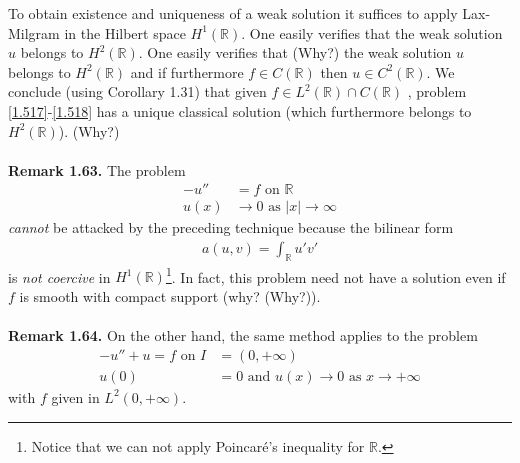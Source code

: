 \documentclass[a4paper,oneside]{article}
\numberwithin{equation}{section}
\begin{document}
To obtain existence and uniqueness of a weak solution it suffices to apply Lax-Milgram in the Hilbert space $H^1\left(\mathbb{R}\right)$. One easily verifies that the weak solution $u$ belongs to $H^2\left(\mathbb{R}\right)$. One easily verifies that (Why?) the weak solution $u$ belongs to $H^2\left(\mathbb{R}\right)$ and if furthermore $f\in C\left(\mathbb{R}\right)$ then $u\in C^2\left(\mathbb{R}\right)$. We conclude (using Corollary 1.31) that given $f \in {L^2}\left( \mathbb{R} \right) \cap C\left( \mathbb{R} \right)$ , problem \eqref{1.517}-\eqref{1.518} has a unique classical solution (which furthermore belongs to $H^2\left(\mathbb{R}\right)$). (Why?)\\
\\
\textbf{Remark 1.63.} The problem
\begin{align}
 - u'' &= f\mbox{ on } \mathbb{R}\\
u\left( x \right) &\to 0\mbox{ as } \left| x \right| \to \infty 
\end{align}
\textit{cannot} be attacked by the preceding technique because the bilinear form 
\begin{align}
a\left( {u,v} \right) = \int_{\mathbb{R}} {u'v'} 
\end{align}
is \textit{not coercive} in $H^1\left(\mathbb{R}\right)$\footnote{Notice that we can not apply Poincar\'{e}'s inequality for $\mathbb{R}$.}. In fact, this problem need not have a solution even if $f$ is smooth with compact support (why? (Why?)).\\
\\
\textbf{Remark 1.64.} On the other hand, the same method applies to the problem
\begin{align}
 - u'' + u = f\mbox{ on } I &= \left( {0, + \infty } \right)\\
u\left( 0 \right) &= 0\mbox{ and } u\left( x \right) \to 0\mbox{ as } x \to  + \infty 
\end{align}
with $f$ given in $L^2\left(0,+\infty\right)$.
\end{document}
